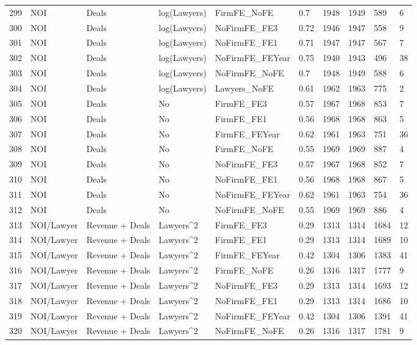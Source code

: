 \begin{table}[ht]
\begin{tabular}{rlllllllll}
  299 & NOI & Deals & log(Lawyers) & FirmFE\_NoFE & 0.7 & 1948 & 1949 & 589 & 6 \\ 
  300 & NOI & Deals & log(Lawyers) & NoFirmFE\_FE3 & 0.72 & 1946 & 1947 & 558 & 9 \\ 
  301 & NOI & Deals & log(Lawyers) & NoFirmFE\_FE1 & 0.71 & 1947 & 1947 & 567 & 7 \\ 
  302 & NOI & Deals & log(Lawyers) & NoFirmFE\_FEYear & 0.75 & 1940 & 1943 & 496 & 38 \\ 
  303 & NOI & Deals & log(Lawyers) & NoFirmFE\_NoFE & 0.7 & 1948 & 1949 & 588 & 6 \\ 
  304 & NOI & Deals & log(Lawyers) & Lawyers\_NoFE & 0.61 & 1962 & 1963 & 775 & 2 \\ 
  305 & NOI & Deals & No & FirmFE\_FE3 & 0.57 & 1967 & 1968 & 853 & 7 \\ 
  306 & NOI & Deals & No & FirmFE\_FE1 & 0.56 & 1968 & 1968 & 863 & 5 \\ 
  307 & NOI & Deals & No & FirmFE\_FEYear & 0.62 & 1961 & 1963 & 751 & 36 \\ 
  308 & NOI & Deals & No & FirmFE\_NoFE & 0.55 & 1969 & 1969 & 887 & 4 \\ 
  309 & NOI & Deals & No & NoFirmFE\_FE3 & 0.57 & 1967 & 1968 & 852 & 7 \\ 
  310 & NOI & Deals & No & NoFirmFE\_FE1 & 0.56 & 1968 & 1968 & 867 & 5 \\ 
  311 & NOI & Deals & No & NoFirmFE\_FEYear & 0.62 & 1961 & 1963 & 754 & 36 \\ 
  312 & NOI & Deals & No & NoFirmFE\_NoFE & 0.55 & 1969 & 1969 & 886 & 4 \\ 
  313 & NOI/Lawyer & Revenue + Deals & Lawyers^2 & FirmFE\_FE3 & 0.29 & 1313 & 1314 & 1684 & 12 \\ 
  314 & NOI/Lawyer & Revenue + Deals & Lawyers^2 & FirmFE\_FE1 & 0.29 & 1313 & 1314 & 1689 & 10 \\ 
  315 & NOI/Lawyer & Revenue + Deals & Lawyers^2 & FirmFE\_FEYear & 0.42 & 1304 & 1306 & 1383 & 41 \\ 
  316 & NOI/Lawyer & Revenue + Deals & Lawyers^2 & FirmFE\_NoFE & 0.26 & 1316 & 1317 & 1777 & 9 \\ 
  317 & NOI/Lawyer & Revenue + Deals & Lawyers^2 & NoFirmFE\_FE3 & 0.29 & 1313 & 1314 & 1693 & 12 \\ 
  318 & NOI/Lawyer & Revenue + Deals & Lawyers^2 & NoFirmFE\_FE1 & 0.29 & 1313 & 1314 & 1686 & 10 \\ 
  319 & NOI/Lawyer & Revenue + Deals & Lawyers^2 & NoFirmFE\_FEYear & 0.42 & 1304 & 1306 & 1391 & 41 \\ 
  320 & NOI/Lawyer & Revenue + Deals & Lawyers^2 & NoFirmFE\_NoFE & 0.26 & 1316 & 1317 & 1781 & 9 \\ 
   \hline
\end{tabular}
\end{table}
